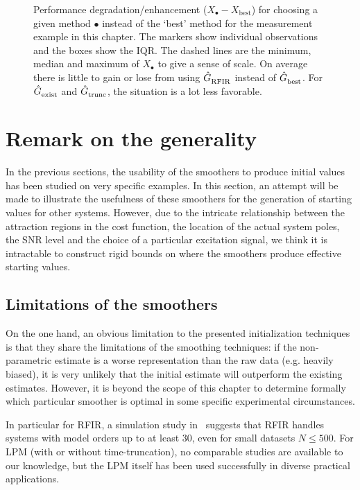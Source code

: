 \begin{figure}
  \centering
  \setlength{\figurewidth}{0.75\columnwidth}
  \setlength{\figureheight}{0.60\figurewidth}
  
  \caption[Performance degradation/enhancement for selecting the second best model.]{
  Performance degradation/enhancement ($X_{\bullet}-X_{\mathrm{best}}$) for choosing a given method $\bullet$ instead of the `best' method for the measurement example in this chapter.
  The markers show individual observations and the boxes show the \gls{IQR}.
  The dashed lines are the minimum, median and maximum of $X_{\bullet}$ to give a sense of scale.
  On average there is little to gain or lose from using $\hat{G}_{\mathrm{RFIR}}^{\mathrm{}}$ instead of $\hat{G}_{\mathrm{best}}^{\mathrm{}}$.
  For $\hat{G}_{\mathrm{exist}}^{\mathrm{}}$ and $\hat{G}_{\mathrm{trunc}}^{\mathrm{}}$, the situation is a lot less favorable.
  }
  \label{fig:init:histogramEnhancement}
\end{figure}

\section{Remark on the generality}
\label{se:Generality}
In the previous sections, the usability of the smoothers to produce initial values has been studied on very specific examples.
In this section, an attempt will be made to illustrate the usefulness of these smoothers for the generation of starting values for other systems.
However, due to the intricate relationship between the attraction regions in the cost function, the location of the actual system poles, the \gls{SNR} level and the choice of a particular excitation signal, we think it is intractable to construct rigid bounds on where the smoothers produce effective starting values.

\subsection{Limitations of the smoothers}
On the one hand, an obvious limitation to the presented initialization techniques is that they share the limitations of the smoothing techniques: if the non-parametric estimate is a worse representation than the raw data (e.g. heavily biased), it is very unlikely that the initial estimate will outperform the existing estimates.
However, it is beyond the scope of this chapter to determine formally which particular smoother is optimal in some specific experimental circumstances.

In particular for RFIR, a simulation study in~\citep{Chen2013} suggests that RFIR handles systems with model orders up to at least $30$, even for small datasets $N\leq 500$.
For LPM (with or without time-truncation), no comparable studies are available to our knowledge, but the LPM itself has been used successfully in diverse practical applications.

